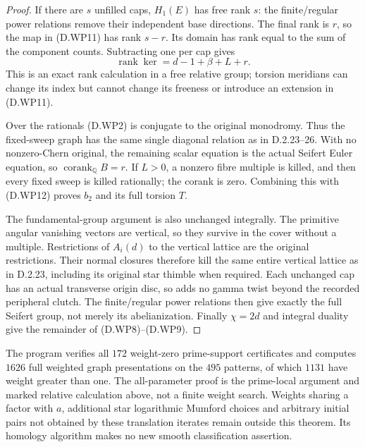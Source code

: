 \begin{proof}
If there are $s$ unfilled caps, $H_1(E)$ has free
rank $s$: the finite/regular power relations
remove their independent base directions.
The final rank is $r$, so the map in (D.WP11)
has rank $s-r$. Its domain has rank equal to
the sum of the component counts. Subtracting
one per cap gives
\[
 \operatorname{rank}\ker
   =d-1+\beta+L+r.                                        \tag{D.WP12}
\]
This is an exact rank calculation in a free
relative group; torsion meridians can change
its index but cannot change its freeness or
introduce an extension in (D.WP11).

Over the rationals (D.WP2) is conjugate to the
original monodromy. Thus the fixed-sweep graph
has the same single diagonal relation as in
D.2.23--26. With no nonzero-Chern original,
the remaining scalar equation is the actual
Seifert Euler equation, so
$\operatorname{corank}_{\mathbb Q}B=r$.
If $L>0$, a nonzero fibre multiple is killed,
and then every fixed sweep is killed rationally;
the corank is zero. Combining this with
(D.WP12) proves $b_2$ and its full torsion $T$.

The fundamental-group argument is also unchanged
integrally. The primitive angular vanishing
vectors are vertical, so they survive in the
cover without a multiple. Restrictions of
$A_i(d)$ to the vertical lattice are the
original restrictions. Their normal closures
therefore kill the same entire vertical
lattice as in D.2.23, including its original
star thimble when required. Each unchanged
cap has an actual transverse origin disc, so
adds no gamma twist beyond the recorded
peripheral clutch. The finite/regular power
relations then give exactly the full Seifert
group, not merely its abelianization.
Finally $\chi=2d$ and integral duality give
the remainder of (D.WP8)--(D.WP9).
\end{proof}

The program verifies all $172$ weight-zero
prime-support certificates and computes $1626$
full weighted graph presentations on the $495$
patterns, of which $1131$ have weight greater
than one. The all-parameter proof is the
prime-local argument and marked relative
calculation above, not a finite weight search.
Weights sharing a factor with $a$, additional
star logarithmic Mumford choices and arbitrary
initial pairs not obtained by these translation
iterates remain outside this theorem. Its
homology algorithm makes no new smooth
classification assertion.
